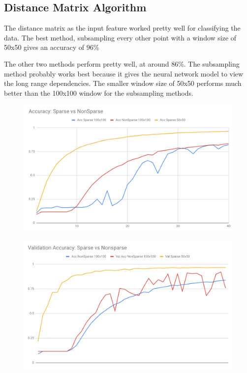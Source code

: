 \documentclass[12pt, a4paper, twocolumn, fullpage]{article}
\theoremstyle{plain}
\theoremstyle{definition}
\theoremstyle{remark}
\begin{document}
\subsection{Distance Matrix Algorithm}
	The distance matrix as the input feature worked pretty well for classifying the data. The best method, subsampling every other point with a window size of 50x50 gives an accuracy of 96\%
	
	The other two methods perform pretty well, at around 86\%.
	The subsampling method probably works best because it gives the neural network model to view the long range dependencies.
	The smaller window size of 50x50 performs much better than the 100x100 window for the subsampling methods.	
	
	\begin{figure}[t]
	  \includegraphics[width=\linewidth]{AccSparsevsNonSparse.png}
	  \caption{}
	  \label{fig:network}
	\end{figure}
	
	\begin{figure}[t]
	  \includegraphics[width=\linewidth]{ValAccSparsevsNonsparse.png}
	  \caption{}
	  \label{fig:network}
	\end{figure}
\end{document}

